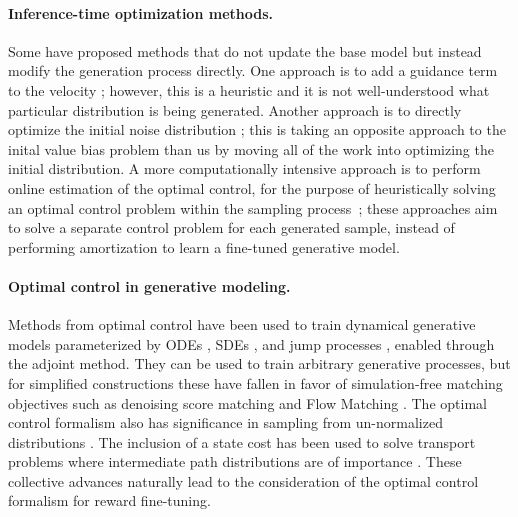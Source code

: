 \documentclass[]{fairmeta}
\begin{document}
\paragraph{Inference-time optimization methods.} Some have proposed methods that do not update the base model but instead modify the generation process directly. One approach is to add a guidance term to the velocity \citep{chung2022diffusion,song2023pseudoinverse,pokle2023training}; however, this is a heuristic and it is not well-understood what particular distribution is being generated. Another approach is to directly optimize the initial noise distribution \citep{li2021differentiable,wallace2023endtoend,benhamu2024dflow}; this is taking an opposite approach to the inital value bias problem than us by moving all of the work into optimizing the initial distribution. 
A more computationally intensive approach is to perform online estimation of the optimal control, for the purpose of heuristically solving an optimal control problem within the sampling process~\citep{huang2024symbolic,rout2024rb}; these approaches aim to solve a separate control problem for each generated sample, instead of performing amortization \citep{amos2023tutorial} to learn a fine-tuned generative model.

\paragraph{Optimal control in generative modeling.} Methods from optimal control have been used to train dynamical generative models parameterized by ODEs \citep{chen2018neural}, SDEs \citep{li2020scalable}, and jump processes \citep{chen2021learning}, enabled through the adjoint method. 
They can be used to train arbitrary generative processes, but for simplified constructions these have fallen in favor of simulation-free matching objectives such as denoising score matching \citep{vincent2011connection} and Flow Matching \citep{lipman2023flow}. 
The optimal control formalism also has significance in sampling from un-normalized distributions \citep{zhang2022path,berner2023optimal,vargas2023denoising,vargas2022bayesian,richter2024improved,tzen2019theoretical}. 
The inclusion of a state cost has been used to solve transport problems where intermediate path distributions are of importance \citep{liu2023generalized,pooladian2024neural}.
These collective advances naturally lead to the consideration of the optimal control formalism for reward fine-tuning.
\end{document}

